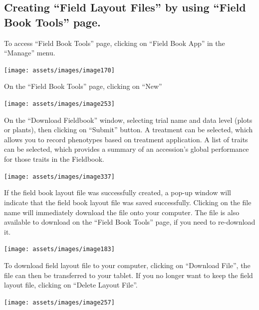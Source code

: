 \documentclass[
  12pt,
]{book}
\begin{document}
\hypertarget{creating-field-layout-files-by-using-field-book-tools-page.}{%
\subsection{Creating ``Field Layout Files'' by using ``Field Book Tools'' page.}\label{creating-field-layout-files-by-using-field-book-tools-page.}}

To access ``Field Book Tools'' page, clicking on ``Field Book App'' in the ``Manage'' menu.

\begin{center}\texttt{[image: assets/images/image170]} \end{center}

On the ``Field Book Tools'' page, clicking on ``New''

\begin{center}\texttt{[image: assets/images/image253]} \end{center}

On the ``Download Fieldbook'' window, selecting trial name and data level (plots or plants), then clicking on ``Submit'' button. A treatment can be selected, which allows you to record phenotypes based on treatment application. A list of traits can be selected, which provides a summary of an accession's global performance for those traits in the Fieldbook.

\begin{center}\texttt{[image: assets/images/image337]} \end{center}

If the field book layout file was successfully created, a pop-up window will indicate that the field book layout file was saved successfully. Clicking on the file name will immediately download the file onto your computer. The file is also available to download on the ``Field Book Tools'' page, if you need to re-download it.

\begin{center}\texttt{[image: assets/images/image183]} \end{center}

To download field layout file to your computer, clicking on ``Download File'', the file can then be transferred to your tablet. If you no longer want to keep the field layout file, clicking on ``Delete Layout File''.

\begin{center}\texttt{[image: assets/images/image257]} \end{center}
\end{document}
